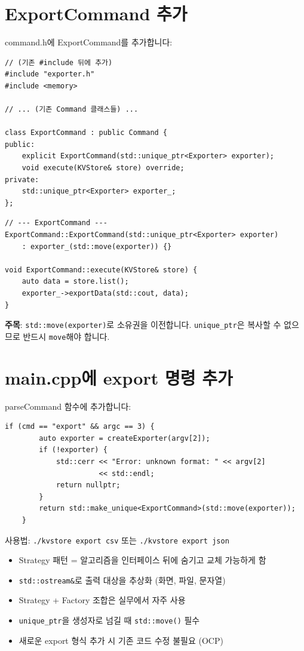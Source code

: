 \documentclass[11pt,a4paper]{book}
\newcommand{\file}[1]{\texttt{#1}}
\newcommand{\code}[1]{\texttt{#1}}
\begin{document}
\section{ExportCommand 추가}

command.h에 ExportCommand를 추가합니다:

\begin{lstlisting}[style=cpp,title={\file{src/command.h}에 추가}]
// (기존 #include 뒤에 추가)
#include "exporter.h"
#include <memory>

// ... (기존 Command 클래스들) ...

class ExportCommand : public Command {
public:
    explicit ExportCommand(std::unique_ptr<Exporter> exporter);
    void execute(KVStore& store) override;
private:
    std::unique_ptr<Exporter> exporter_;
};
\end{lstlisting}

\begin{lstlisting}[style=cpp,title={\file{src/command.cpp}에 추가}]
// --- ExportCommand ---
ExportCommand::ExportCommand(std::unique_ptr<Exporter> exporter)
    : exporter_(std::move(exporter)) {}

void ExportCommand::execute(KVStore& store) {
    auto data = store.list();
    exporter_->exportData(std::cout, data);
}
\end{lstlisting}

\textbf{주목}: \code{std::move(exporter)}로 소유권을 이전합니다. \code{unique\_ptr}은 복사할 수 없으므로 반드시 \code{move}해야 합니다.

\section{main.cpp에 export 명령 추가}

parseCommand 함수에 추가합니다:

\begin{lstlisting}[style=cpp,title={parseCommand에 추가}]
    if (cmd == "export" && argc == 3) {
        auto exporter = createExporter(argv[2]);
        if (!exporter) {
            std::cerr << "Error: unknown format: " << argv[2]
                      << std::endl;
            return nullptr;
        }
        return std::make_unique<ExportCommand>(std::move(exporter));
    }
\end{lstlisting}

사용법: \code{./kvstore export csv} 또는 \code{./kvstore export json}

\begin{summarybox}
\begin{itemize}[nosep]
\item Strategy 패턴 = 알고리즘을 인터페이스 뒤에 숨기고 교체 가능하게 함
\item \code{std::ostream\&}로 출력 대상을 추상화 (화면, 파일, 문자열)
\item Strategy + Factory 조합은 실무에서 자주 사용
\item \code{unique\_ptr}을 생성자로 넘길 때 \code{std::move()} 필수
\item 새로운 export 형식 추가 시 기존 코드 수정 불필요 (OCP)
\end{itemize}
\end{summarybox}
\end{document}
